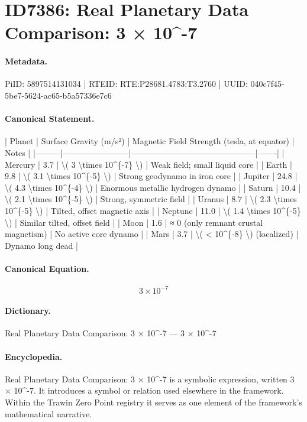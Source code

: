 \section*{ID7386: Real Planetary Data Comparison: 3 × 10\textasciicircum{}-7}
\paragraph{Metadata.}
PiID: 5897514131034 | RTEID: RTE:P28681.4783:T3.2760 | UUID: 040c7f45-5be7-5624-ac65-b5a57336e7c6

\paragraph{Canonical Statement.}
| Planet | Surface Gravity (m/s²) | Magnetic Field Strength (tesla, at equator) | Notes | |---------|------------------------|---------------------------------------------|-------| | Mercury | 3.7 | \textbackslash{}( 3 \textbackslash{}times 10\textasciicircum{}\{-7\} \textbackslash{}) | Weak field; small liquid core | | Earth | 9.8 | \textbackslash{}( 3.1 \textbackslash{}times 10\textasciicircum{}\{-5\} \textbackslash{}) | Strong geodynamo in iron core | | Jupiter | 24.8 | \textbackslash{}( 4.3 \textbackslash{}times 10\textasciicircum{}\{-4\} \textbackslash{}) | Enormous metallic hydrogen dynamo | | Saturn | 10.4 | \textbackslash{}( 2.1 \textbackslash{}times 10\textasciicircum{}\{-5\} \textbackslash{}) | Strong, symmetric field | | Uranus | 8.7 | \textbackslash{}( 2.3 \textbackslash{}times 10\textasciicircum{}\{-5\} \textbackslash{}) | Tilted, offset magnetic axis | | Neptune | 11.0 | \textbackslash{}( 1.4 \textbackslash{}times 10\textasciicircum{}\{-5\} \textbackslash{}) | Similar tilted, offset field | | Moon | 1.6 | ≈ 0 (only remnant crustal magnetism) | No active core dynamo | | Mars | 3.7 | \textbackslash{}( < 10\textasciicircum{}\{-8\} \textbackslash{}) (localized) | Dynamo long dead |

\paragraph{Canonical Equation.}
\[
3 \times 10^{-7}
\]

\paragraph{Dictionary.}
Real Planetary Data Comparison: 3 × 10\textasciicircum{}-7 — 3 × 10\textasciicircum{}-7

\paragraph{Encyclopedia.}
Real Planetary Data Comparison: 3 × 10\textasciicircum{}-7 is a symbolic expression, written 3 × 10\textasciicircum{}-7. It introduces a symbol or relation used elsewhere in the framework. Within the Trawin Zero Point registry it serves as one element of the framework's mathematical narrative.
